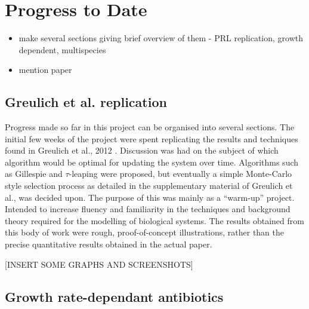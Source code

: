 \documentclass[a4paper,12pt]{article}
\begin{document}
\section{Progress to Date}

\begin{itemize}
 \item make several sections giving brief overview of them - PRL replication, growth dependent, multispecies 
 \item mention paper
\end{itemize}



\subsection{Greulich et al. replication}

Progress made so far in this project can be organised into several sections.  The initial few weeks of the project 
were spent replicating the results and techniques found in Greulich et al., 2012 \cite{bioref:PRL-drugGradients}.  Discussion was had
on the subject of which algorithm would be optimal for updating the system over time.  Algorithms such as Gillespie \cite{bioref:Gillespie-algorithm} 
and $\tau$-leaping \cite{bioref:tau-leap-algorithm} were proposed, but eventually a simple Monte-Carlo style selection process as detailed in the supplementary material 
of Greulich et al., was decided upon.  The purpose of this was mainly as a ``warm-up'' project.  Intended to increase fluency and familiarity in the techniques and background 
theory required for the modelling of biological systems.  The results obtained from this body of work were rough, proof-of-concept illustrations, rather than the precise 
quantitative results obtained in the actual paper.

[INSERT SOME GRAPHS AND SCREENSHOTS]


\subsection{Growth rate-dependant antibiotics}
\end{document}
